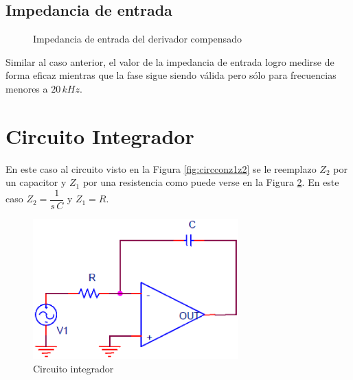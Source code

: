 \subsection{Impedancia de entrada}
\begin{figure}[H]
	\begin{center}
		\caption{Impedancia de entrada del derivador compensado}
		\label{fig:zinsuperDERivadorCompensado}
	\end{center}
\end{figure}

Similar al caso anterior, el valor de la impedancia de entrada logro medirse de forma eficaz mientras que la fase sigue siendo válida pero sólo para frecuencias menores a $20 \, kHz$.








\section{Circuito Integrador}
En este caso al circuito visto en la Figura \ref{fig:circconz1z2} se le reemplazo $Z_2$ por un capacitor y $Z_1$ por una resistencia como puede verse en la Figura \ref{fig:circuitointegrador}. En este caso $Z_2=\dfrac{1}{s \, C}$ y $Z_1= R$.

\begin{figure}[H]
\centering
\includegraphics[scale=0.5]{../Ex4/circuitointegrador.png}
\caption{Circuito integrador}
\label{fig:circuitointegrador}
\end{figure}

